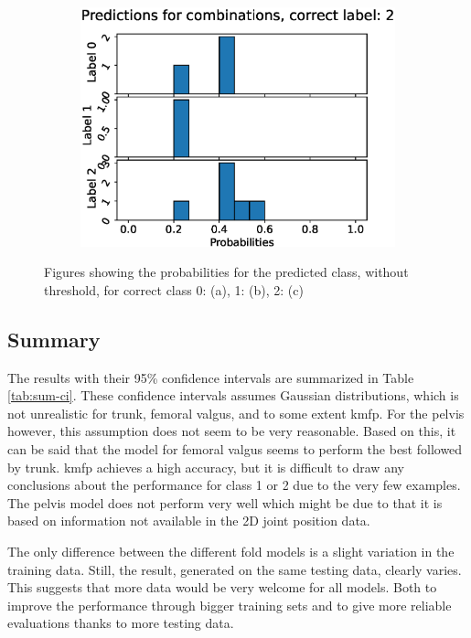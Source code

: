 \begin{figure}
\begin{subfigure}[t]{0.33\textwidth}
    \includegraphics[width=\textwidth]{files/figs/res/kmfp/pc2.eps}
    \caption{}
    \label{fig:kmfp-pc2}
  \end{subfigure}

  \caption{Figures showing the probabilities for the predicted class, without threshold, for correct class 0: (a), 1: (b), 2: (c)}
  \label{fig:kmfp-pc}
\end{figure}

\FloatBarrier
\subsection{Summary}
The results with their 95\% confidence intervals are summarized in Table \ref{tab:sum-ci}. These confidence intervals assumes Gaussian distributions, which is not unrealistic for trunk, femoral valgus, and to some extent \gls{kmfp}. For the pelvis however, this assumption does not seem to be very reasonable. Based on this, it can be said that the model for femoral valgus seems to perform the best followed by trunk. \gls{kmfp} achieves a high accuracy, but it is difficult to draw any conclusions about the performance for class 1 or 2 due to the very few examples. The pelvis model does not perform very well which might be due to that it is based on information not available in the 2D joint position data.

The only difference between the different fold models is a slight variation in the training data. Still, the result, generated on the same testing data, clearly varies. This suggests that more data would be very welcome for all models. Both to improve the performance through bigger training sets and to give more reliable evaluations thanks to more testing data.

